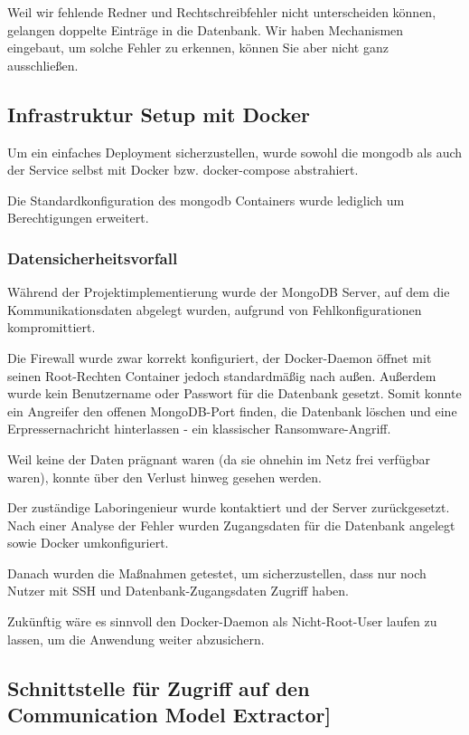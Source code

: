 Weil wir fehlende Redner und Rechtschreibfehler nicht unterscheiden können,
gelangen doppelte Einträge in die Datenbank. Wir haben Mechanismen eingebaut,
um solche Fehler zu erkennen, können Sie aber nicht ganz ausschließen.

\subsection{Infrastruktur Setup mit Docker}
Um ein einfaches Deployment sicherzustellen, wurde sowohl die mongodb als
auch der Service selbst mit Docker bzw. docker-compose abstrahiert.

Die Standardkonfiguration des mongodb Containers wurde lediglich um
Berechtigungen erweitert.

\subsubsection{Datensicherheitsvorfall}

Während der Projektimplementierung wurde der MongoDB Server, auf dem die
Kommunikationsdaten abgelegt wurden, aufgrund von Fehlkonfigurationen
kompromittiert.

Die Firewall wurde zwar korrekt konfiguriert, der Docker-Daemon öffnet mit
seinen Root-Rechten Container jedoch standardmäßig nach außen. Außerdem wurde
kein Benutzername oder Passwort für die Datenbank gesetzt. Somit konnte ein
Angreifer den offenen MongoDB-Port finden, die Datenbank löschen und eine
Erpressernachricht hinterlassen - ein klassischer Ransomware-Angriff.

Weil keine der Daten prägnant waren (da sie ohnehin im Netz frei verfügbar
waren), konnte über den Verlust hinweg gesehen werden.

Der zuständige Laboringenieur wurde kontaktiert und der Server zurückgesetzt.
Nach einer Analyse der Fehler wurden Zugangsdaten für die Datenbank angelegt
sowie Docker umkonfiguriert.

Danach wurden die Maßnahmen getestet, um sicherzustellen, dass nur noch
Nutzer mit SSH und Datenbank-Zugangsdaten Zugriff haben.

Zukünftig wäre es sinnvoll den Docker-Daemon als Nicht-Root-User laufen zu
lassen, um die Anwendung weiter abzusichern.

\subsection{Schnittstelle für Zugriff auf den Communication Model Extractor]}


